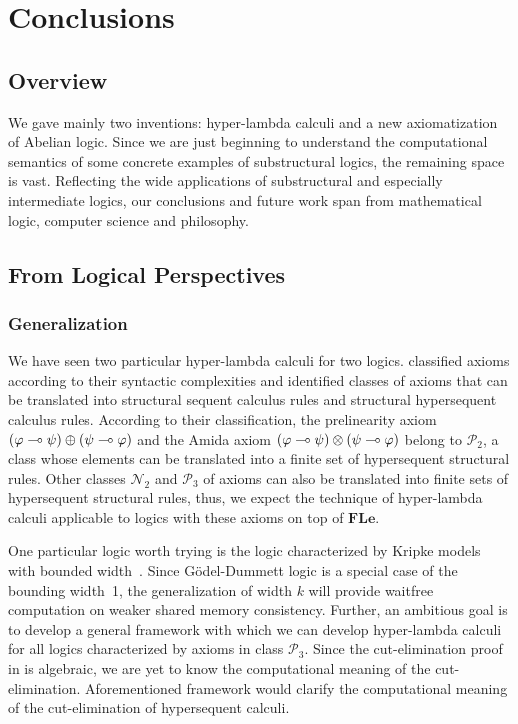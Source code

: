 \chapter{Conclusions}

\section{Overview}

We gave mainly two inventions: hyper-lambda calculi and a new
axiomatization of Abelian logic.
Since we are just beginning to understand the computational semantics of
some concrete examples of substructural logics, the remaining space is
vast.
Reflecting the wide applications of substructural and especially
intermediate logics,
our conclusions and future work span from mathematical logic, computer
science and philosophy.

\section{From Logical Perspectives}

\subsection{Generalization}

We have seen two particular hyper-lambda calculi for two logics.
\citet{alg} classified axioms according to their syntactic complexities
and identified classes of axioms that can be translated into structural
sequent calculus rules and structural hypersequent calculus rules.
According to their classification, the prelinearity axiom
$(\varphi\multimap\psi)\oplus(\psi\multimap\varphi)$ and the Amida axiom
$(\varphi\multimap\psi)\otimes(\psi\multimap\varphi)$ belong to $\mathcal P_2$, a
class whose elements can be translated into a finite set of
hypersequent structural rules.
Other classes $\mathcal N_2$ and $\mathcal P_3$ of axioms can also be
translated into finite sets of hypersequent structural rules,
thus, we expect the technique of hyper-lambda calculi applicable to
logics with these axioms on top of $\mathbf{FLe}$.

One particular logic worth trying is
the logic characterized by Kripke models with bounded width~\citep{Ciabattoni01042001}.
Since G\"odel-Dummett logic is a special case of the bounding width~1,
the generalization of width $k$ will provide waitfree computation on
weaker shared memory consistency.  Further,
an ambitious goal is to develop a general framework with which we can
develop hyper-lambda calculi for all logics characterized by axioms in
class $\mathcal P_3$.
Since the cut-elimination proof in \citep{alg} is algebraic,
we are yet to know the computational meaning of the cut-elimination.
Aforementioned framework would clarify the computational meaning of the
cut-elimination of hypersequent calculi.

